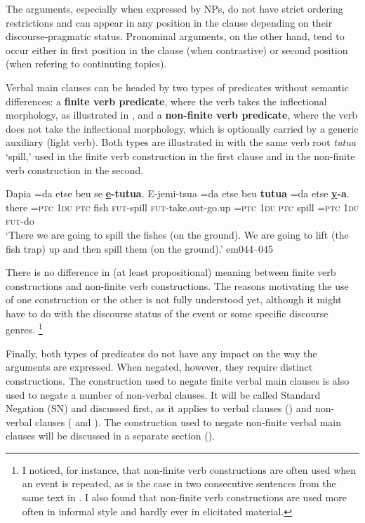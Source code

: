 \documentclass[output=paper]{langsci/langscibook}
\begin{document}
%
The arguments, especially when expressed by NPs, do not have strict ordering restrictions and can appear in any position in the clause depending on their discourse-pragmatic status. Pronominal arguments, on the other hand, tend to occur either in first position in the clause (when contrastive) or second position (when refering to continuting topics).

Verbal main clauses can be headed by two types of predicates without
semantic differences: a \textbf{finite verb predicate},
where the verb takes the inflectional morphology, as illustrated in
, and a \textbf{non-finite verb
predicate}, where the verb does not take the inflectional morphology, which
is optionally carried by a generic auxiliary (light verb). Both types are
illustrated in  with the same verb root
\textit{tutua} `spill,' used in the finite verb construction in the first
clause and in the non-finite verb construction in the second.
%
\begin{exe}\ex
\label{ex:tacana-spill-the-fishes}
\gll Dapia  =da  etse  beu  se  \textbf{\underline{e}-tutua}.  E-jemi-tsua
=da  etse beu  \textbf{tutua}  =da  etse  \textbf{\underline{y}-a}.\\ 
    there  =\textsc{ptc}  \textsc{1du}  \textsc{ptc}  fish
    \textsc{fut}-spill  \textsc{fut}-take.out-go.up  =\textsc{ptc}
    1\textsc{du} \textsc{ptc}  spill  =\textsc{ptc}  1\textsc{du}
    \textsc{fut-}do\\ 
\glt `There we are going to spill the fishes (on the ground). We are going
to lift (the fish trap) up and then spill them (on the ground).' em044--045
\end{exe}
%
There is no difference in (at least propositional) meaning between finite
verb constructions and non-finite verb constructions. The reasons
motivating the use of one construction or the other is not fully understood
yet, although it might have to do with the discourse status of the event or
some specific discourse genres.%
%
    \footnote{I noticed, for instance, that non-finite verb constructions
    are often used when an event is repeated, as is the case in two
    consecutive sentences from the same text in . I
    also found that non-finite verb constructions are used more often in
    informal style and hardly ever in elicitated material.}

Finally, both types of predicates do not have any impact on the way the
arguments are expressed. When negated, however, they require distinct
constructions. The construction used to negate finite verbal main clauses
is also used to negate a number of non-verbal clauses. It will be called
Standard Negation (SN) and discussed first, as it applies to
verbal clauses () and non-verbal clauses ( and ). The construction used to negate non-finite verbal main clauses will be discussed in a separate section ().
\end{document}
